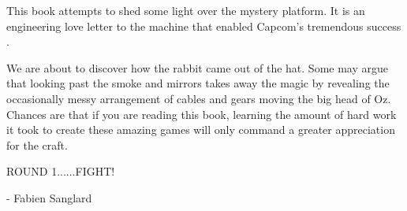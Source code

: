 This book attempts to shed some light over the mystery platform. It is an engineering love letter to the machine that enabled Capcom's tremendous success . 

We are about to discover how the rabbit came out of the hat. Some may argue that looking past the smoke and mirrors takes away the magic by revealing the occasionally messy arrangement of cables and gears moving the big head of Oz. Chances are that if you are reading this book, learning the amount of hard work it took to create these amazing games will only command a greater appreciation for the craft.

ROUND 1......FIGHT!

- Fabien Sanglard